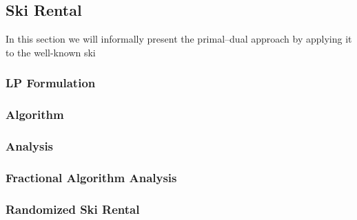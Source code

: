 \subsection{Ski Rental}

In this section we will informally present the primal--dual approach by applying it to the well-known ski 

\subsubsection{LP Formulation}


\subsubsection{Algorithm}

\subsubsection{Analysis}

\subsubsection{Fractional Algorithm Analysis}

\subsubsection*{Randomized Ski Rental}